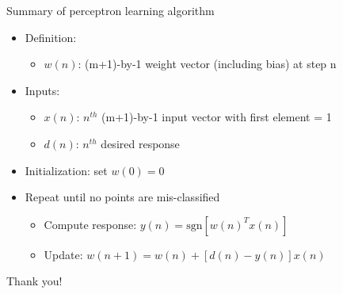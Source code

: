 \documentclass[notes]{beamer}
\newcommand{\chuhao}{\fontsize{44.9pt}{\baselineskip}\selectfont}
\providecommand{\tightlist}{%
  \setlength{\itemsep}{0pt}\setlength{\parskip}{0pt}}
\begin{document}
\begin{frame}{Summary of perceptron learning algorithm}

\begin{itemize}
\tightlist
\item
  Definition:

  \begin{itemize}
  \tightlist
  \item
    \(w(n)\): (m+1)-by-1 weight vector (including bias) at step n
  \end{itemize}
\item
  Inputs:

  \begin{itemize}
  \tightlist
  \item
    \(x(n)\): \(n^{th}\) (m+1)-by-1 input vector with first element = 1
  \item
    \(d(n)\): \(n^{th}\) desired response
  \end{itemize}
\item
  Initialization: set \(w(0)=0\)
\item
  Repeat until no points are mis-classified

  \begin{itemize}
  \tightlist
  \item
    Compute response: \(y(n)=\mathrm{sgn}\left[w(n)^T x(n) \right]\)
  \item
    Update: \(w(n+1)=w(n) + \left[d(n) -y(n) \right]x(n)\)
  \end{itemize}
\end{itemize}

\end{frame}

\begin{frame}
	\chuhao Thank you! %
\end{frame}
\end{document}
